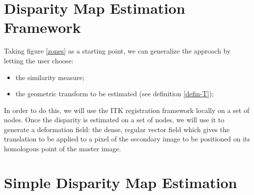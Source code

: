

\section{Disparity Map Estimation Framework}
\label{sec:DisparityMapEstimationFramework}
Taking figure \ref{zones} as a starting point, we can generalize the
approach by letting the user choose:
\begin{itemize}
  \item the similarity measure;
  \item the geometric transform to be estimated (see definition
  \ref{defin-T});
\end{itemize}

In order to do this, we will use the ITK registration framework
locally on a set of nodes. Once the disparity is estimated on a set of
nodes, we will use it to generate a deformation field: the dense,
regular vector field which gives the translation to be applied to
a pixel of the secondary image to be positioned on its homologous
point of the master image.

\section{Simple Disparity Map Estimation}
\label{sec:SimpleDisparityMapEstimation}







